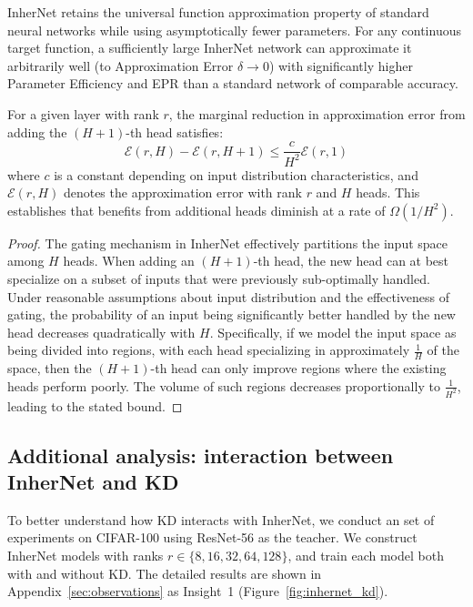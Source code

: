 \documentclass{article} %
\begin{document}
\begin{corollary}
\label{cor:universal}
InherNet retains the universal function approximation property of standard neural networks while using asymptotically fewer parameters. For any continuous target function, a sufficiently large InherNet network can approximate it arbitrarily well (to Approximation Error $\delta \to 0$) with significantly higher Parameter Efficiency and EPR than a standard network of comparable accuracy.
\end{corollary}

\begin{proposition}
\label{prop:head-diminishing}
For a given layer with rank $r$, the marginal reduction in approximation error from adding the $(H+1)$-th head satisfies:
\begin{equation}
\mathcal{E}(r,H) - \mathcal{E}(r,H+1) \leq \frac{c}{H^2}\mathcal{E}(r,1)
\end{equation}
where $c$ is a constant depending on input distribution characteristics, and $\mathcal{E}(r,H)$ denotes the approximation error with rank $r$ and $H$ heads. This establishes that benefits from additional heads diminish at a rate of $\Omega(1/H^2)$.
\end{proposition}

\begin{proof}
The gating mechanism in InherNet effectively partitions the input space among $H$ heads. When adding an $(H+1)$-th head, the new head can at best specialize on a subset of inputs that were previously sub-optimally handled. Under reasonable assumptions about input distribution and the effectiveness of gating, the probability of an input being significantly better handled by the new head decreases quadratically with $H$. Specifically, if we model the input space as being divided into regions, with each head specializing in approximately $\frac{1}{H}$ of the space, then the $(H+1)$-th head can only improve regions where the existing heads perform poorly. The volume of such regions decreases proportionally to $\frac{1}{H^2}$, leading to the stated bound.
\end{proof}

\subsection{Additional analysis: interaction between InherNet and KD}
\label{app:distill-large-r}

To better understand how KD interacts with InherNet, we conduct an set of experiments on CIFAR-100 using ResNet-56 as the teacher. We construct InherNet models with ranks
$r \in \{8, 16, 32, 64, 128\}$, and train each model both with and without KD. The detailed results are shown in Appendix~\ref{sec:observations} as Insight~1 (Figure~\ref{fig:inhernet_kd}).
\end{document}

